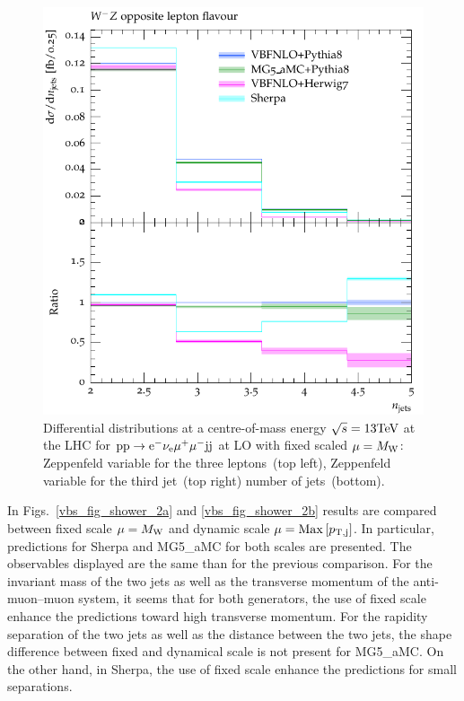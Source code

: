 \begin{figure}[htbp]
\begin{center}
   \includegraphics[scale=0.65]{figs/VBFNLO_WmZ_OF_nJets}
\caption{Differential distributions at a centre-of-mass energy $\sqrt{s}=13{\rm TeV}$ at the LHC for ${\rm p} {\rm p}
  \to {\rm e}^-  \nu_{\rm e}  \mu^+ \mu^- {\rm j} {\rm j}$ at LO with fixed scaled $\mu = M_{\rm W}$: 
                Zeppenfeld variable for the three leptons~(top left),
                Zeppenfeld variable for the third jet~(top right)
                number of jets~(bottom).
                }
\label{vbs_fig_shower_1b}
\end{center}
\end{figure}

In Figs.~\ref{vbs_fig_shower_2a} and \ref{vbs_fig_shower_2b} results are compared between fixed scale $\mu = M_{\rm W}$ and dynamic scale $\mu = {\rm Max}\left[p_{\rm T, j}\right]$.
In particular, predictions for {\sc Sherpa} and {\sc MG5\_aMC} for both scales are presented.
The observables displayed are the same than for the previous comparison.
For the invariant mass of the two jets as well as the transverse momentum of the anti-muon--muon system, it seems that for both generators, the use of fixed scale enhance the predictions toward high transverse momentum.
For the rapidity separation of the two jets as well as the distance between the two jets, the shape difference between fixed and dynamical scale is not present for {\sc MG5\_aMC}.
On the other hand, in {\sc Sherpa}, the use of fixed scale enhance the predictions for small separations.

